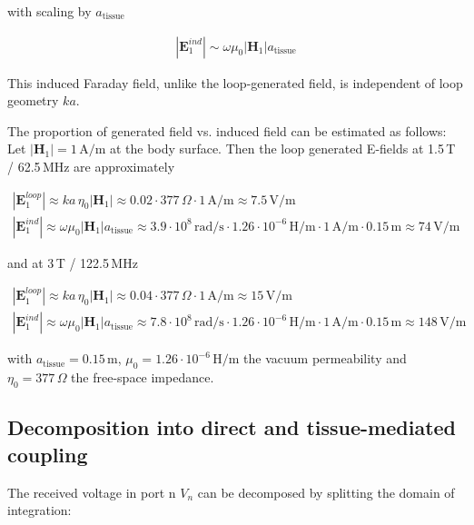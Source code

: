 with scaling by $a_{\mathrm{tissue}}$

\begin{align}
    \label{ScaledFaraday}
    |\mathbf{E}_1^{ind}| \sim \omega \mu_0 |\mathbf{H}_1| a_{\mathrm{tissue}}
\end{align}

 This induced Faraday field, unlike the loop-generated field, is independent of loop geometry $ka$.

The proportion of generated field vs. induced field can be estimated as follows: Let $|\mathbf{H}_1|=1\,\mathrm{A/m}$ at the body surface. Then the loop generated E-fields at 1.5\,T / 62.5\,MHz are approximately

\begin{align}
    \label{LoopEField15T}
    |\mathbf{E}_1^{loop}| \approx ka \, \eta_0 |\mathbf{H}_1| \approx 0.02 \cdot 377\,\Omega \cdot 1\,\mathrm{A/m} \approx 7.5\,\mathrm{V/m} \\
    \label{inducedField15T}
    |\mathbf{E}_1^{ind}| \approx \omega \mu_0 |\mathbf{H}_1| a_{\mathrm{tissue}} \approx 3.9 \cdot 10^8 \,\mathrm{rad/s} \cdot 1.26 \cdot 10^{-6}\,\mathrm{H/m} \cdot  1\,\mathrm{A/m} \cdot 0.15\,\mathrm{m} \approx 74 \,\mathrm{V/m}
\end{align}

and at 3\,T / 122.5\,MHz

\begin{align}
    \label{LoopEField3T}
    |\mathbf{E}_1^{loop}| \approx ka \, \eta_0 |\mathbf{H}_1| \approx 0.04 \cdot 377\,\Omega \cdot 1\,\mathrm{A/m} \approx 15\,\mathrm{V/m} \\
    \label{inducedField3T}
    |\mathbf{E}_1^{ind}| \approx \omega \mu_0 |\mathbf{H}_1| a_{\mathrm{tissue}} \approx 7.8 \cdot 10^8 \,\mathrm{rad/s} \cdot 1.26 \cdot 10^{-6}\,\mathrm{H/m} \cdot  1\,\mathrm{A/m} \cdot 0.15\,\mathrm{m} \approx 148 \,\mathrm{V/m}
\end{align}

with $a_{\mathrm{tissue}}=0.15\,\mathrm{m}$, $\mu_0=1.26\cdot 10^{-6}\,\mathrm{H/m}$ the vacuum permeability and $\eta_0=377\,\Omega$ the free-space impedance.

\subsection{Decomposition into direct and tissue-mediated coupling}

The received voltage in port n $V_n$ can be decomposed by splitting the domain of integration:

